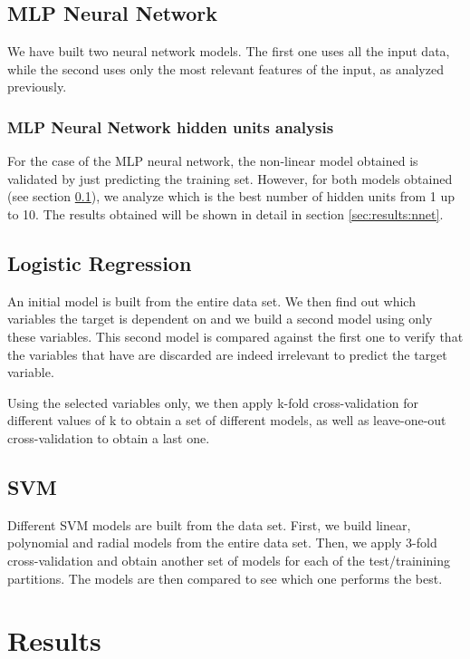 \documentclass[english]{scrartcl}
\begin{document}
    \subsection{MLP Neural Network}
    \label{sec:methods:nnet}
    We have built two neural network models. The first one uses all the input data, while the second uses only the most
    relevant features of the input, as analyzed previously.
    
    \subsubsection{MLP Neural Network hidden units analysis}
    For the case of the MLP neural network, the non-linear model obtained is validated by just predicting the training set. However, for both models obtained
    (see section \ref{sec:methods:nnet}), we analyze which is the best number of hidden units from 1 up to 10. The results obtained will be shown in detail in
    section \ref{sec:results:nnet}.
    
    \subsection{Logistic Regression}
    An initial model is built from the entire data set. We then find out which variables the target is dependent on and we build a second model using only these variables. This second model is compared against the first one to verify that the variables that have are discarded are indeed irrelevant to predict the target variable.
    
    Using the selected variables only, we then apply k-fold cross-validation for different values of k to obtain a set of different models, as well as leave-one-out cross-validation to obtain a last one.
    
    \subsection{SVM}
    Different SVM models are built from the data set. First, we build linear, polynomial and radial models from the entire data set. Then, we apply 3-fold cross-validation and obtain another set of models for each of the test/trainining partitions. The models are then compared to see which one performs the best.

\section{Results}
\end{document}
